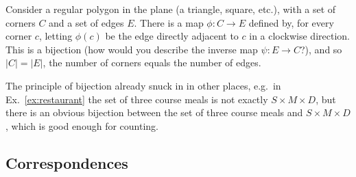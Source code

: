 \documentclass{amsart}
\begin{document}
\begin{nex}
	Consider a regular polygon in the plane (a triangle, square, etc.), with a set of corners $C$ and a set of edges $E$.
	There is a map $\phi \colon C \to E$ defined by, for every corner $c$, letting $\phi(c)$ be the edge directly adjacent to $c$ in a clockwise direction.
	This is a bijection (how would you describe the inverse map $\psi \colon E \to C$?), and so $|C| = |E|$, the number of corners equals the number of edges.
\end{nex}
	
\begin{nremark}
	The principle of bijection already snuck in in other places, e.g.~in Ex.~\ref{ex:restaurant} the set of three course meals is not exactly $S \times M \times D$, but there is an obvious bijection between the set of three course meals and $S \times M \times D$, which is good enough for counting.
\end{nremark}

\subsection{Correspondences}
\end{document}
